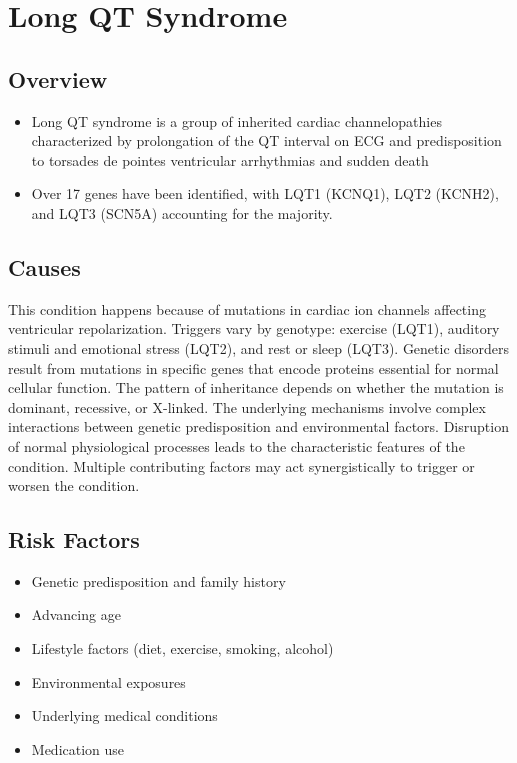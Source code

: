 \chapter{Long QT Syndrome}
\label{sec:Long QT Syndrome}

\section{Overview}


\begin{itemize}[noitemsep]
  \item Long QT syndrome is a group of inherited cardiac channelopathies characterized by prolongation of the QT interval on ECG and predisposition to torsades de pointes ventricular arrhythmias and sudden death
  \item Over 17 genes have been identified, with LQT1 (KCNQ1), LQT2 (KCNH2), and LQT3 (SCN5A) accounting for the majority.
\end{itemize}
\section{Causes}
This condition happens because of mutations in cardiac ion channels affecting ventricular repolarization. Triggers vary by genotype: exercise (LQT1), auditory stimuli and emotional stress (LQT2), and rest or sleep (LQT3). Genetic disorders result from mutations in specific genes that encode proteins essential for normal cellular function. The pattern of inheritance depends on whether the mutation is dominant, recessive, or X-linked. The underlying mechanisms involve complex interactions between genetic predisposition and environmental factors. Disruption of normal physiological processes leads to the characteristic features of the condition. Multiple contributing factors may act synergistically to trigger or worsen the condition.
\section{Risk Factors}


\begin{itemize}[noitemsep]
  \item Genetic predisposition and family history
  \item Advancing age
  \item Lifestyle factors (diet, exercise, smoking, alcohol)
  \item Environmental exposures
  \item Underlying medical conditions
  \item Medication use
\end{itemize}
